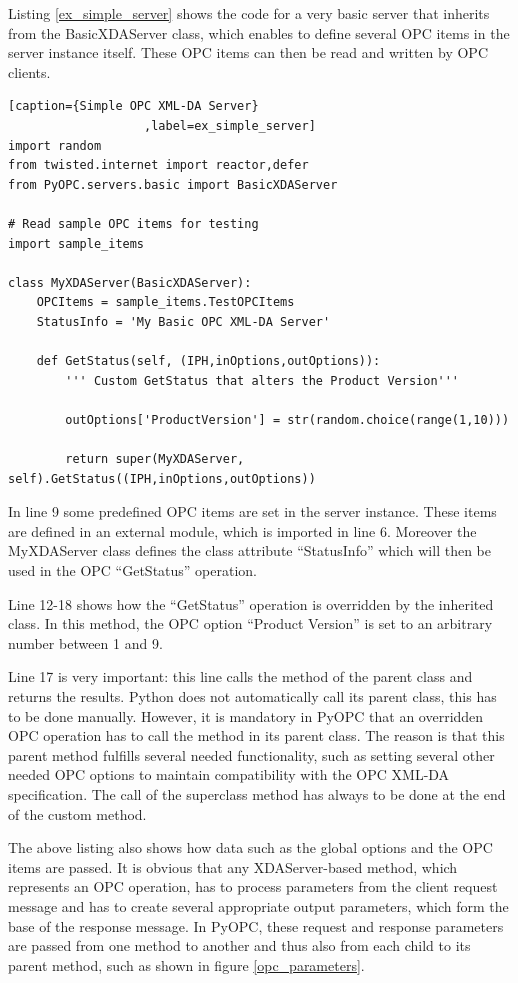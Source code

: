 Listing \ref{ex_simple_server} shows the code for a very basic server
that inherits from the BasicXDAServer class, which enables to define
several OPC items in the server instance itself. These OPC items can
then be read and written by OPC clients.

\lstset{language=C}
\begin{lstlisting}[caption={Simple OPC XML-DA Server}
                   ,label=ex_simple_server] 
import random
from twisted.internet import reactor,defer
from PyOPC.servers.basic import BasicXDAServer

# Read sample OPC items for testing
import sample_items

class MyXDAServer(BasicXDAServer):
    OPCItems = sample_items.TestOPCItems
    StatusInfo = 'My Basic OPC XML-DA Server'

    def GetStatus(self, (IPH,inOptions,outOptions)):
        ''' Custom GetStatus that alters the Product Version'''

        outOptions['ProductVersion'] = str(random.choice(range(1,10)))
        
        return super(MyXDAServer, self).GetStatus((IPH,inOptions,outOptions))
\end{lstlisting}

In line 9 some predefined OPC items are set in the server instance. These
items are defined in an external module, which is imported in line 6.
Moreover the MyXDAServer class defines the class attribute ``StatusInfo''
which will then be used in the OPC ``GetStatus'' operation.

Line 12-18 shows how the ``GetStatus'' operation is overridden by the
inherited class. In this method, the OPC option ``Product Version'' is
set to an arbitrary number between 1 and 9.

Line 17 is very important: this line calls the method of the parent
class and returns the results. Python does not automatically call its
parent class, this has to be done manually.  However, it is mandatory
in PyOPC that an overridden OPC operation has to call the method in
its parent class. The reason is that this parent method fulfills
several needed functionality, such as setting several other needed OPC
options to maintain compatibility with the OPC XML-DA specification.
The call of the superclass method has always to be done at the
end of the custom method.

The above listing also shows how data such as the global options and
the OPC items are passed. It is obvious that any XDAServer-based
method, which represents an OPC operation, has to process parameters
from the client request message and has to create several appropriate
output parameters, which form the base of the response message. In
PyOPC, these request and response parameters are passed from one
method to another and thus also from each child to its parent method,
such as shown in figure \ref{opc_parameters}.

